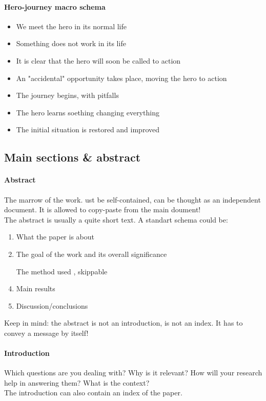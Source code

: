 \documentclass{article}
\begin{document}
\paragraph{Hero-journey macro schema}
\begin{itemize}
\item We meet the hero in its normal life
\item Something does not work in its life
\item It is clear that the hero will soon be called to action
\item An "accidental" opportunity takes place, moving the hero to action
\item The journey begins, with pitfalls 
\item The hero learns soething changing everything
\item The initial situation is restored and improved
\end{itemize}

\subsection{Main sections \& abstract}
\paragraph{Abstract} The marrow of the work. ust be self-contained, can be thought as an independent document. It is allowed to copy-paste from the main doument!\\
The abstract is usually a quite short text. A standart schema could be:
\begin{enumerate}
\item What the paper is about
\item The goal of the work and its overall significance
\item [The method used], skippable
\item Main results
\item Discussion/conclusions
\end{enumerate}
Keep in mind: the abstract is not an introduction, is not an index. It has to convey a message by itself!
\paragraph{Introduction} Which questions are you dealing with? Why is it relevant? How will your research help in answering them? What is the context?\\
The introduction can also contain an index of the paper.
\end{document}
